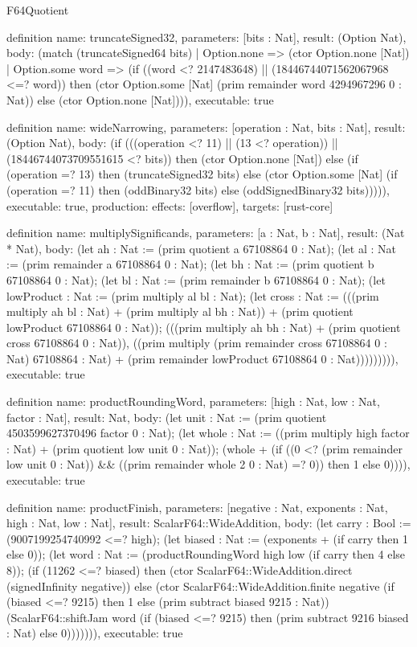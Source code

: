 \begin{lexlean}{F64Quotient}
\begin{semanticmodule}
definition{
  name: truncateSigned32,
  parameters: [bits : Nat],
  result: (Option Nat),
  body: (match (truncateSigned64 bits)
    | Option.none => (ctor Option.none [Nat])
    | Option.some word => (if ((word <? 2147483648) || (18446744071562067968 <=? word)) then (ctor Option.some [Nat] (prim remainder word 4294967296 0 : Nat)) else (ctor Option.none [Nat]))),
  executable: true
}

definition{
  name: wideNarrowing,
  parameters: [operation : Nat, bits : Nat],
  result: (Option Nat),
  body: (if (((operation <? 11) || (13 <? operation)) || (18446744073709551615 <? bits)) then (ctor Option.none [Nat]) else (if (operation =? 13) then (truncateSigned32 bits) else (ctor Option.some [Nat] (if (operation =? 11) then (oddBinary32 bits) else (oddSignedBinary32 bits))))),
  executable: true,
  production: {effects: [overflow], targets: [rust-core]}
}

definition{
  name: multiplySignificands,
  parameters: [a : Nat, b : Nat],
  result: (Nat * Nat),
  body: (let ah : Nat := (prim quotient a 67108864 0 : Nat); (let al : Nat := (prim remainder a 67108864 0 : Nat); (let bh : Nat := (prim quotient b 67108864 0 : Nat); (let bl : Nat := (prim remainder b 67108864 0 : Nat); (let lowProduct : Nat := (prim multiply al bl : Nat); (let cross : Nat := (((prim multiply ah bl : Nat) + (prim multiply al bh : Nat)) + (prim quotient lowProduct 67108864 0 : Nat)); (((prim multiply ah bh : Nat) + (prim quotient cross 67108864 0 : Nat)), ((prim multiply (prim remainder cross 67108864 0 : Nat) 67108864 : Nat) + (prim remainder lowProduct 67108864 0 : Nat))))))))),
  executable: true
}

definition{
  name: productRoundingWord,
  parameters: [high : Nat, low : Nat, factor : Nat],
  result: Nat,
  body: (let unit : Nat := (prim quotient 4503599627370496 factor 0 : Nat); (let whole : Nat := ((prim multiply high factor : Nat) + (prim quotient low unit 0 : Nat)); (whole + (if ((0 <? (prim remainder low unit 0 : Nat)) && ((prim remainder whole 2 0 : Nat) =? 0)) then 1 else 0)))),
  executable: true
}

definition{
  name: productFinish,
  parameters: [negative : Nat, exponents : Nat, high : Nat, low : Nat],
  result: ScalarF64::WideAddition,
  body: (let carry : Bool := (9007199254740992 <=? high); (let biased : Nat := (exponents + (if carry then 1 else 0)); (let word : Nat := (productRoundingWord high low (if carry then 4 else 8)); (if (11262 <=? biased) then (ctor ScalarF64::WideAddition.direct (signedInfinity negative)) else (ctor ScalarF64::WideAddition.finite negative (if (biased <=? 9215) then 1 else (prim subtract biased 9215 : Nat)) (ScalarF64::shiftJam word (if (biased <=? 9215) then (prim subtract 9216 biased : Nat) else 0))))))),
  executable: true
}


\end{semanticmodule}
\end{lexlean}
